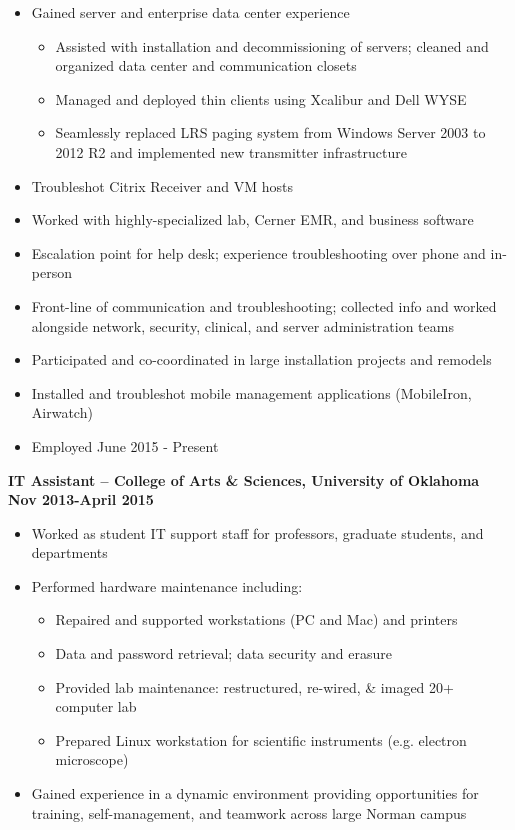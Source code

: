 \documentclass[centered]{res}
\begin{document}
\begin{resume}
\begin{itemize}
\begin{itemize}
			\end{itemize}		
	\item Gained server and enterprise data center experience
		\begin{itemize}
			\item Assisted with installation and decommissioning of servers; cleaned and organized data center and communication closets
			\item Managed and deployed thin clients using Xcalibur and Dell WYSE
			\item Seamlessly replaced LRS paging system from Windows Server 2003 to 2012 R2 and implemented new transmitter infrastructure
		\end{itemize}
	\item Troubleshot Citrix Receiver and VM hosts
	\item Worked with highly-specialized lab, Cerner EMR, and business software
	\item Escalation point for help desk; experience troubleshooting over phone and in-person
	\item Front-line of communication and troubleshooting; collected info and worked alongside network, security, clinical, and server administration teams
	\item Participated and co-coordinated in large installation projects and remodels
	\item Installed and troubleshot mobile management applications (MobileIron, Airwatch)
	\item{Employed June 2015 - Present}
\end{itemize}
\textbf{IT Assistant -- College of Arts \& Sciences, University of Oklahoma}
\newline
\textbf{Nov 2013-April 2015}
\begin{itemize}
	\item Worked as student IT support staff for professors, graduate students, and departments
	\item Performed hardware maintenance including:
		\begin{itemize}
			\item Repaired and supported workstations (PC and Mac) and printers
			\item Data and password retrieval; data security and erasure
			\item Provided lab maintenance: restructured, re-wired, \& imaged 20+ computer lab 
			\item Prepared Linux workstation for scientific instruments (e.g. electron microscope)
		\end{itemize}
	\item Gained experience in a dynamic environment providing opportunities for training, self-management, and teamwork across large Norman campus
\end{itemize}


\end{resume}
\end{document}
